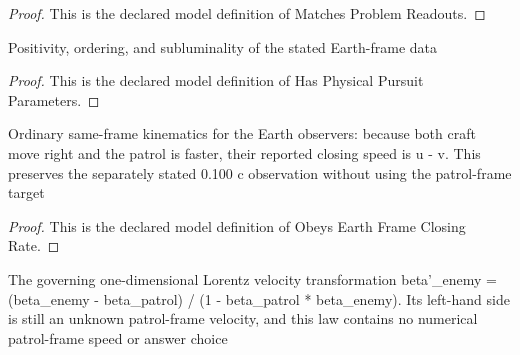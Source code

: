 \begin{proof}
  This is the declared model definition of Matches Problem Readouts.
\end{proof}
\begin{definition}
  \label{def:physics:phyx-mini-0527:phyxminiproblems-problemphyxmini0527-hasphysicalpursuitparameters}
  Positivity, ordering, and subluminality of the stated Earth-frame data
\end{definition}
\begin{proof}
  This is the declared model definition of Has Physical Pursuit Parameters.
\end{proof}
\begin{definition}
  \label{def:physics:phyx-mini-0527:phyxminiproblems-problemphyxmini0527-obeysearthframeclosingrate}
  Ordinary same-frame kinematics for the Earth observers: because both craft move right and the patrol is faster, their reported closing speed is u - v. This preserves the separately stated 0.100 c observation without using the patrol-frame target
\end{definition}
\begin{proof}
  This is the declared model definition of Obeys Earth Frame Closing Rate.
\end{proof}
\begin{definition}
  \label{def:physics:phyx-mini-0527:phyxminiproblems-problemphyxmini0527-obeyscollinearrelativisticvelocitytransformation}
  The governing one-dimensional Lorentz velocity transformation beta'\_enemy = (beta\_enemy - beta\_patrol) / (1 - beta\_patrol * beta\_enemy). Its left-hand side is still an unknown patrol-frame velocity, and this law contains no numerical patrol-frame speed or answer choice
\end{definition}
